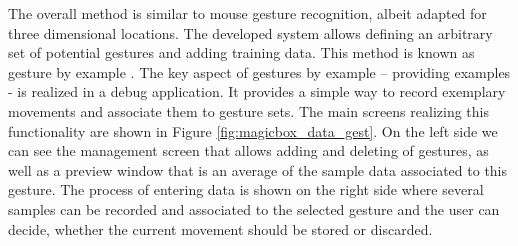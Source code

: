 The overall method is similar to mouse gesture recognition, albeit adapted for three dimensional locations. The developed system allows defining an arbitrary set of potential gestures and adding training data. This method is known as gesture by example \cite{Rubine1991}. The key aspect of gestures by example – providing examples - is realized in a debug application. It provides a simple way to record exemplary movements and associate them to gesture sets. The main screens realizing this functionality are shown in Figure \ref{fig:magicbox_data_gest}. On the left side we can see the management screen that allows
adding and deleting of gestures, as well as a preview window that is an average of the sample data associated to this gesture. The process of entering data is shown on the right side where several samples can be recorded and associated to the selected gesture and the user can decide, whether the current movement should be stored or discarded.
